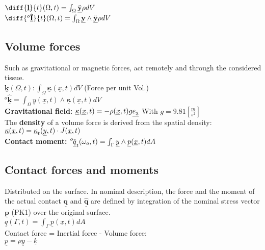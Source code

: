 $ \diff{\underline{\mathbf{l}}}{t}(\Omega, t) = \int_{\Omega} \ddot{\underline{\mathbf{y}}} \rho dV$ \\
$\diff{^{o}\underline{\mathbf{\hat{I}}}}{t} (\Omega, t) = \int_{\Omega} \underline{\mathbf{y}} \wedge \ddot{\underline{\mathbf{y}}} \rho dV$ \\

\subsection*{Volume forces}
\smallskip
Such as gravitational or magnetic forces, act remotely and through the considered tissue. \\
$ \underline{\mathbf{k}}(\Omega, t): \int_{\Omega} \underline{\mathbf{\kappa}}(\underline{x},t) dV $ (Force per unit Vol.) \\
$ ^{o}\underline{\mathbf{\hat{k}}} = \int_{\Omega} \underline{y} (\underline{x},t) \wedge \underline{\mathbf{\kappa}}(\underline{x},t) dV $ \\

\textbf{Gravitational field:} $\underline{\mathbf{\kappa}}(\underline{x},t) = - \rho (\underline{x},t) g \underline{\tensor[]{e}{_3}} $ With $g = 9.81 [\frac{m}{s^2}]$ \\
The \textbf{density} of a volume force is derived from the spatial density:
$\underline{\mathbf{\kappa}}(\underline{x},t) = \tensor[]{\underline{\mathbf{\kappa}}}{_t}(\underline{y},t) \cdot J(\underline{x},t) $ \\
\textbf{Contact moment:} $\tensor[^o]{\hat{\underline{q}}}{_t} (\omega_o, t) = \int_{\Gamma} \underline{y} \wedge \underline{p} (\underline{x},t) dA $ \\

\columnbreak
 
\subsection*{Contact forces and moments}
\smallskip
Distributed on the surface. In nominal description, the force and the moment of the actual contact $\underline{\mathbf{q}}$ and $\underline{\mathbf{\hat{q}}}$ are defined by integration of the nominal stress vector $\underline{\mathbf{p}}$ (PK1) over the original surface. \\
$\underline{q} (\Gamma,t) = \int_{\Gamma} \underline{p}(\underline{x},t)dA$ \\

Contact force = Inertial force - Volume force: \\
$\underline{p} = \rho \underline{\ddot{y}} - \underline{k}$ \\

